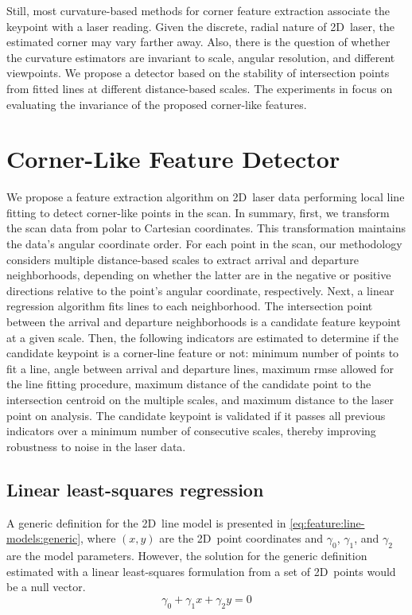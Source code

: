 Still, most curvature-based methods for corner feature extraction associate
the keypoint with a laser reading. Given the discrete, radial nature
of 2D~laser, the estimated corner may vary farther away.
Also, there is the question of whether the curvature estimators
are invariant to scale, angular resolution, and different viewpoints.
We propose a detector based on the stability of intersection points
from fitted lines at different distance-based scales.
The experiments in  focus
on evaluating the invariance of the proposed corner-like features.

\section{Corner-Like Feature Detector}\label{sec:features:method}

We propose a feature extraction algorithm on 2D~laser data performing
local line fitting to detect corner-like points in the scan.
In summary, first, we transform the scan data from polar to Cartesian
coordinates. This transformation maintains the data's angular coordinate order.
For each point in the scan, our methodology considers multiple distance-based
scales to extract arrival and departure neighborhoods,
depending on whether the latter are in the negative or positive directions
relative to the point's angular coordinate, respectively.
Next, a linear regression algorithm fits lines to each neighborhood.
The intersection point between the arrival and departure neighborhoods
is a candidate feature keypoint at a given scale.
Then, the following indicators are estimated to determine
if the candidate keypoint is a corner-line feature or not:
minimum number of points to fit a line,
angle between arrival and departure lines,
maximum \gls{rmse} allowed for the line fitting procedure, maximum distance
of the candidate point to the intersection centroid on the multiple scales,
and maximum distance to the laser point on analysis.
The candidate keypoint is validated if it passes
all previous indicators over a minimum number of consecutive scales,
thereby improving robustness to noise in the laser data.

\subsection{Linear least-squares regression}\label{sec:features:method:linear-regression}

A generic definition for the 2D~line model is presented in
\eqref{eq:feature:line-models:generic}, where $\left(x,y\right)$ are
the 2D~point coordinates and $\gamma_0$, $\gamma_1$, and $\gamma_2$
are the model parameters. However, the solution for the generic definition
estimated with a linear least-squares formulation
from a set of 2D~points would be a null vector.
\begin{equation}\label{eq:feature:line-models:generic}
\gamma_0 + \gamma_1 x + \gamma_2 y = 0
\end{equation}

